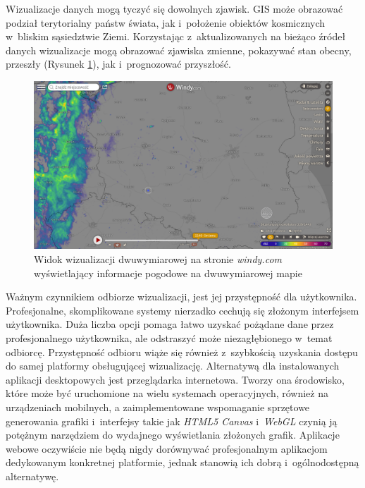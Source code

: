 Wizualizacje danych mogą tyczyć się dowolnych zjawisk. GIS może obrazować podział terytorialny państw świata, jak i~położenie obiektów kosmicznych w~bliskim sąsiedztwie Ziemi. Korzystając z~aktualizowanych na bieżąco źródeł danych wizualizacje mogą obrazować zjawiska zmienne, pokazywać stan obecny, przeszły (Rysunek \ref{fig:c1_windy}), jak i~prognozować przyszłość. 

\begin{figure}[h]
    \centering
    \includegraphics[width=\linewidth]{img/c1_windy.png}
    \caption{Widok wizualizacji dwuwymiarowej na stronie \textit{windy.com} wyświetlający informacje pogodowe na dwuwymiarowej mapie}
    \label{fig:c1_windy}
\end{figure}

Ważnym czynnikiem odbiorze wizualizacji, jest jej przystępność dla użytkownika. Profesjonalne, skomplikowane systemy nierzadko cechują się złożonym interfejsem użytkownika. Duża liczba opcji pomaga łatwo uzyskać pożądane dane przez profesjonalnego użytkownika, ale odstraszyć może niezagłębionego w~temat odbiorcę. Przystępność odbioru wiąże się również z~szybkością uzyskania dostępu do samej platformy obsługującej wizualizację. Alternatywą dla instalowanych aplikacji desktopowych jest przeglądarka internetowa. Tworzy ona środowisko, które może być uruchomione na wielu systemach operacyjnych, również na urządzeniach mobilnych, a zaimplementowane wspomaganie sprzętowe generowania grafiki i~interfejsy takie jak \textit{HTML5 Canvas}\cite{Canvas} i~\textit{WebGL}\cite{WebGL} czynią ją potężnym narzędziem do wydajnego wyświetlania złożonych grafik. 
Aplikacje webowe oczywiście nie będą nigdy dorównywać profesjonalnym aplikacjom dedykowanym konkretnej platformie, jednak stanowią ich dobrą i~ogólnodostępną alternatywę.

